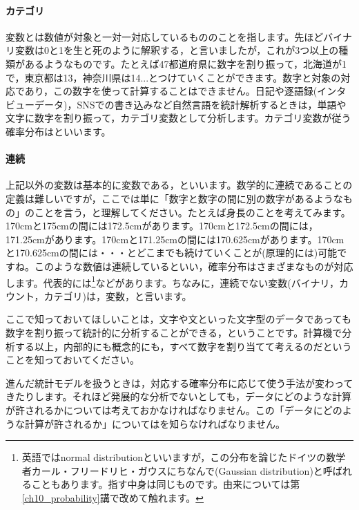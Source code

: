 \documentclass{ltjsbook}
\begin{document}
\paragraph{カテゴリ}
変数とは数値が対象と一対一対応しているもののことを指します。先ほどバイナリ変数は0と1を生と死のように解釈する，と言いましたが，これが3つ以上の種類があるようなものです。たとえば47都道府県に数字を割り振って，北海道が1で，東京都は13，神奈川県は14...とつけていくことができます。数字と対象の対応であり，この数字を使って計算することはできません。日記や逐語録(インタビューデータ)，SNSでの書き込みなど自然言語を統計解析するときは，単語や文字に数字を割り振って，カテゴリ変数として分析します。カテゴリ変数が従う確率分布はといいます。
\paragraph{連続}
上記以外の変数は基本的に変数である，といいます。数学的に連続であることの定義は難しいですが，ここでは単に「数字と数字の間に別の数字があるようなもの」のことを言う，と理解してください。たとえば身長のことを考えてみます。170cmと175cmの間には172.5cmがあります。170cmと172.5cmの間には，171.25cmがあります。170cmと171.25cmの間には170.625cmがあります。170cmと170.625cmの間には・・・とどこまでも続けていくことが(原理的には)可能ですね。このような数値は連続しているといい，確率分布はさまざまなものが対応します。代表的には\footnote{英語ではnormal distributionといいますが，この分布を論じたドイツの数学者カール・フリードリヒ・ガウスにちなんで(Gaussian distribution)と呼ばれることもあります。指す中身は同じものです。由来については第\ref{ch10_probability}講で改めて触れます。}などがあります。ちなみに，連続でない変数(バイナリ，カウント，カテゴリ)は，変数，と言います。

ここで知っておいてほしいことは，文字や文といった文字型のデータであっても数字を割り振って統計的に分析することができる，ということです。計算機で分析する以上，内部的にも概念的にも，すべて数字を割り当てて考えるのだということを知っておいてください。

進んだ統計モデルを扱うときは，対応する確率分布に応じて使う手法が変わってきたりします。それほど発展的な分析でないとしても，データにどのような計算が許されるかについては考えておかなければなりません。この「データにどのような計算が許されるか」についてはを知らなければなりません。
\end{document}
